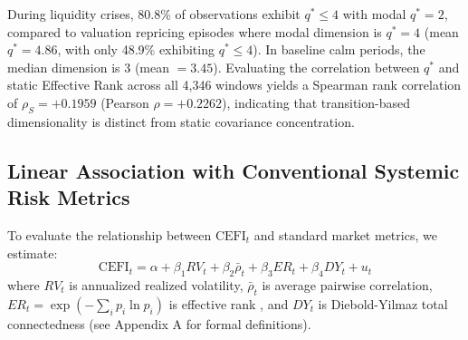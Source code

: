 \documentclass[review,12pt,authoryear]{elsarticle}
\begin{document}
During liquidity crises, 80.8\% of observations exhibit $q^* \le 4$ with modal $q^* = 2$, compared to valuation repricing episodes where modal dimension is $q^* = 4$ (mean $q^* = 4.86$, with only 48.9\% exhibiting $q^* \le 4$). In baseline calm periods, the median dimension is 3 (mean $= 3.45$). Evaluating the correlation between $q^*$ and static Effective Rank across all 4,346 windows yields a Spearman rank correlation of $\rho_S = +0.1959$ (Pearson $\rho = +0.2262$), indicating that transition-based dimensionality is distinct from static covariance concentration.

\subsection{Linear Association with Conventional Systemic Risk Metrics}
To evaluate the relationship between $\mathrm{CEFI}_t$ and standard market metrics, we estimate:
\begin{equation}
\mathrm{CEFI}_t = \alpha + \beta_1 RV_t + \beta_2 \bar{\rho}_t + \beta_3 ER_t + \beta_4 DY_t + u_t
\end{equation}
where $RV_t$ is annualized realized volatility, $\bar{\rho}_t$ is average pairwise correlation, $ER_t = \exp(-\sum_i p_i \ln p_i)$ is effective rank \citep{roy2007effective}, and $DY_t$ is Diebold-Yilmaz total connectedness \citep{diebold2012better} (see Appendix A for formal definitions).

\begin{table}[htbp]
\centering
\caption{Linear Association Between $\mathrm{CEFI}_t$ and Conventional Systemic Risk Benchmarks (HAC Newey-West $L=40$)}
\label{tab:benchmarks_h4}
\end{table}
\end{document}
